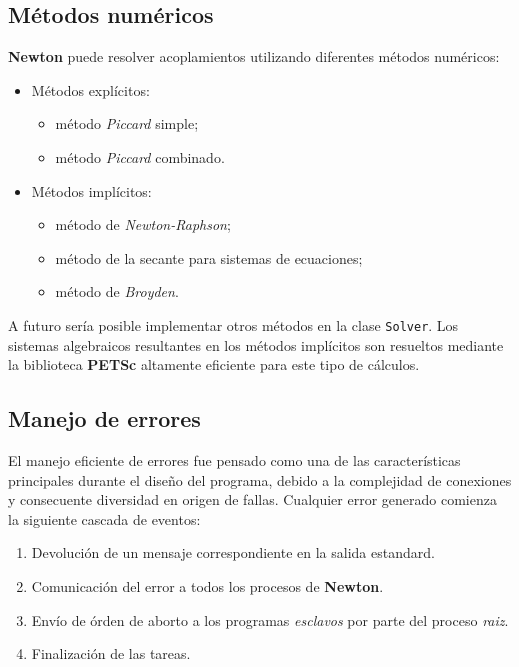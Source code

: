 \subsection*{Métodos numéricos}
\label{ap2:num-met}

\textbf{Newton} puede resolver acoplamientos utilizando diferentes métodos numéricos:
\begin{itemize}
\item Métodos explícitos:
\begin{itemize}
\item método \textit{Piccard} simple;
\item método \textit{Piccard} combinado.
\end{itemize}
\item Métodos implícitos:
\begin{itemize}
\item método de \textit{Newton-Raphson};
\item método de la secante para sistemas de ecuaciones;
\item método de \textit{Broyden}.
\end{itemize}
\end{itemize}
A futuro sería posible implementar otros métodos en la clase \texttt{Solver}.
Los sistemas algebraicos resultantes en los métodos implícitos son resueltos mediante la biblioteca \textbf{PETSc} \cite{petsc-web-page} altamente eficiente para este tipo de cálculos.

\subsection*{Manejo de errores}
\label{ap2:error}

El manejo eficiente de errores fue pensado como una de las características principales durante el diseño del programa,
debido a la complejidad de conexiones y consecuente diversidad en origen de fallas.
Cualquier error generado comienza la siguiente cascada de eventos:
\begin{enumerate}
\item Devolución de un mensaje correspondiente en la salida estandard.
\item Comunicación del error a todos los procesos de \textbf{Newton}.
\item Envío de órden de aborto a los programas \textit{esclavos} por parte del proceso \textit{raiz}.
\item Finalización de las tareas.
\end{enumerate}


